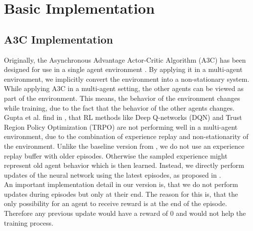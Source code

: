 

%
%

\chapter{Basic Implementation}\label{chap.basic_implementation}
\section{A3C Implementation}\label{a3c_implementation}
Originally, the Asynchronous Advantage Actor-Critic Algorithm (A3C) has been designed for use in a single agent environment \cite{a3c}.
By applying it in a multi-agent environment, we implicitly convert the environment into a non-stationary system.
While applying A3C in a multi-agent setting, the other agents can be viewed as part of the environment. This means, the behavior of the environment changes while training, due to the fact that the behavior of the other agents changes.
Gupta et al. find in \cite{multiagent_comp_a3c_dqn_etc}, that RL methods like Deep Q-networks (DQN) and Trust Region Policy Optimization (TRPO) are not performing well in a multi-agent environment, due to the combination of experience replay and non-stationarity of the environment. Unlike the baseline version from \cite{flatlandstephan}, we do not use an experience replay buffer with older episodes. Otherwise the sampled experience might represent old agent behavior which is then learned. Instead, we directly perform updates of the neural network using the latest episodes, as proposed in \cite{a3c}.\\
An important implementation detail in our version is, that we do not perform updates during episodes but only at their end. The reason for this is, that the only possibility for an agent to receive reward is at the end of the episode. Therefore any previous update would have a reward of 0 and would not help the training process.

